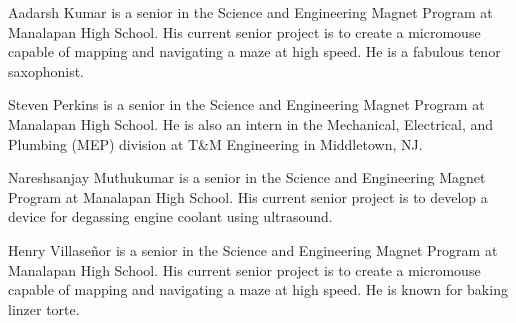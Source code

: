 ﻿\documentclass[10pt,journal,twoside]{IEEEtran}
\begin{document}
\begin{IEEEbiography}{Aadarsh Kumar} is a senior in the Science and Engineering Magnet Program at Manalapan High School. His current senior project is to create a micromouse capable of mapping and navigating a maze at high speed. He is a fabulous tenor saxophonist. 
\end{IEEEbiography}
\begin{IEEEbiography}{Steven Perkins} is a senior in the Science and Engineering Magnet Program at Manalapan High School. He is also an intern in the Mechanical, Electrical, and Plumbing (MEP)  division at T\&M Engineering in Middletown, NJ.
\end{IEEEbiography}
\begin{IEEEbiography}{Nareshsanjay Muthukumar} is a senior in the Science and Engineering Magnet Program at Manalapan High School. His current senior project is to develop a device for degassing engine coolant using ultrasound. 
\end{IEEEbiography}
\vfill
\newpage
\begin{IEEEbiography}{Henry Villase\~{n}or} is a senior in the Science and Engineering Magnet Program at Manalapan High School. His current senior project is to create a micromouse capable of mapping and navigating a maze at high speed. He is known for baking linzer torte. 
\end{IEEEbiography}
\end{document}
